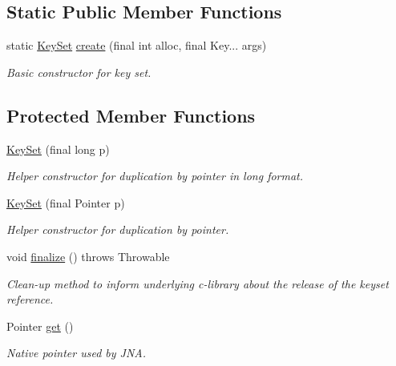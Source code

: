 \subsection*{Static Public Member Functions}
\begin{DoxyCompactItemize}
\item 
static \hyperlink{classorg_1_1libelektra_1_1KeySet}{Key\+Set} \hyperlink{classorg_1_1libelektra_1_1KeySet_a441d0e45a150a6fd5f75be00ec42338d}{create} (final int alloc, final Key... args)
\begin{DoxyCompactList}\small\item\em Basic constructor for key set. \end{DoxyCompactList}\end{DoxyCompactItemize}
\subsection*{Protected Member Functions}
\begin{DoxyCompactItemize}
\item 
\hyperlink{classorg_1_1libelektra_1_1KeySet_a72507fbeb96bfb90e44562e0a8e70331}{Key\+Set} (final long p)
\begin{DoxyCompactList}\small\item\em Helper constructor for duplication by pointer in long format. \end{DoxyCompactList}\item 
\hyperlink{classorg_1_1libelektra_1_1KeySet_adf4ea02b31ed468e49c615f61ea57a15}{Key\+Set} (final Pointer p)
\begin{DoxyCompactList}\small\item\em Helper constructor for duplication by pointer. \end{DoxyCompactList}\item 
\mbox{\label{classorg_1_1libelektra_1_1KeySet_ad11eed8c4aeea5b9af381e0185b3a097}} 
void \hyperlink{classorg_1_1libelektra_1_1KeySet_ad11eed8c4aeea5b9af381e0185b3a097}{finalize} ()  throws Throwable 
\begin{DoxyCompactList}\small\item\em Clean-\/up method to inform underlying c-\/library about the release of the keyset reference. \end{DoxyCompactList}\item 
Pointer \hyperlink{classorg_1_1libelektra_1_1KeySet_abf3f028c9c3b88a47aa9d67a5c8e95da}{get} ()
\begin{DoxyCompactList}\small\item\em Native pointer used by J\+NA. \end{DoxyCompactList}\end{DoxyCompactItemize}
